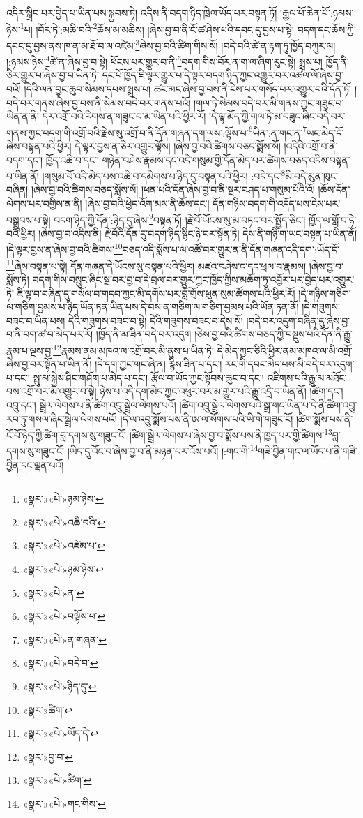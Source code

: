 འདིར་སྒྲིབ་པར་བྱེད་པ་ཡིན་པས་སྐྱབས་ཏེ། འདིས་ནི་བདག་ཉིད་ཁྲེལ་ཡོད་པར་བསྟན་ཏོ། །རྒྱལ་པོ་ཆེན་པོ་:ཉམས་ཉེས་\footnote{«སྣར་»«པེ་»ཉམ་ཉེས་}པ། །བོར་ཏེ་:མཆི་བའི་\footnote{«སྣར་»«པེ་»འཆི་བའི་}ཆོས་མ་མཆིས། །ཞེས་བྱ་བ་ནི་ངོ་ཚ་ཤེས་པའི་དབང་དུ་བྱས་པ་སྟེ། བདག་དང་ཆོས་ཀྱི་དབང་དུ་བྱས་ནས་ཁ་ན་མ་ཐོ་བ་ལ་འཛེམ་\footnote{«སྣར་»«པེ་»འཛེམ་པ་}ཞེས་བྱ་བའི་ཚིག་གིས་སོ། །བདེ་བའི་ཚེ་ན་རྟག་ཏུ་ཁྱོད་བཀུར་ལ། །:ཉམས་ཉེས་\footnote{«སྣར་»«པེ་»ཉམ་ཉེས་}ཚེ་ན་ཞེས་བྱ་བ་སྟེ། ཕོངས་པར་གྱུར་བ་ནི་\footnote{«སྣར་»«པེ་»ན་}བདག་གིས་བོར་ན་ག་ལ་ཞིག་རུང་སྟེ། སྨྲས་པ། ཁྱོད་ནི་ཅིར་གྱུར་པ་ཞེས་བྱ་བ་ཡིན་ཏེ། དང་པོ་ཁྱོད་ཇི་ལྟར་གྱུར་པ་དེ་ལྟར་བདག་ཉིད་ཀྱང་འགྱུར་བར་འཚལ་ལོ་ཞེས་བྱ་བའོ། །དེའི་ལན་བྱང་ཆུབ་སེམས་དཔས་སྨྲས་པ། ཚང་མང་ཞེས་བྱ་བས་ནི་ངེས་པར་གསོད་པར་འགྱུར་བའི་དོན་ཏོ། །བདེ་བར་གནས་ཞེས་བྱ་བས་ནི་སེམས་བདེ་བར་གནས་པའོ། །གལ་ཏེ་སེམས་བདེ་བར་མི་གནས་ཀྱང་གཟུང་བ་ཡིན་ན་ནི། དེར་འགྲོ་བའི་རིགས་ན་གཟུང་བ་མ་ཡིན་པའི་ཕྱིར་རོ། །དེ་ལྟ་མོད་ཀྱི་གལ་ཏེ་མ་བཟུང་ཞིང་བདེ་བར་གནས་ཀྱང་བདག་གི་འགྲོ་བའི་རྗེས་སུ་འགྲོ་བ་ནི་དོན་གཞན་དག་ལས་:ལྟོས་པ་\footnote{«སྣར་»«པེ་»བལྟོས་པ་}ཡིན་:ན་གང་ན་\footnote{«སྣར་»«པེ་»ན་གཞན་}ཡང་མེད་དོ་ཞེས་བསྟན་པའི་ཕྱིར། དེ་ལྟར་བྱས་ན་ཅིར་འགྱུར་ལྟོས། །ཞེས་བྱ་བའི་ཚིགས་བཅད་སྨོས་སོ། །འདིའི་འགྲོ་བ་ནི་བདག་དང་། ཁྱོད་འཆི་བ་དང་། གཉེན་བཤེས་རྣམས་དང་འདི་གསུམ་གྱི་དོན་མེད་པར་ཚིགས་བཅད་འདིས་བསྟན་པ་ཡིན་ནོ། །གསུམ་པོ་འདི་མེད་པས་འཆི་བ་དམིགས་པ་ཉིད་དུ་བསྟན་པའི་ཕྱིར། :བདེ་དང་\footnote{«སྣར་»«པེ་»བདེ་བ་}མི་བདེ་མུན་ཁུང་བཞིན། །ཞེས་བྱ་བའི་ཚིགས་བཅད་སྨོས་སོ། །ཕན་པའི་དོན་ཞེས་བྱ་བ་ནི་སྔར་བཤད་པ་གསུམ་པོའི་འོ། །ཆོས་དོན་ལེགས་པར་བགྱིས་ན་ནི། །ཞེས་བྱ་བའི་ཕྱེད་འོག་མས་ནི་ཆོས་དང་། དོན་གཉིས་བདག་གི་འདོད་པས་ངེས་པར་བསྒྲུབས་པ་སྟེ། བདག་ཉིད་ཀྱི་དོན་:ཉིད་དུ་ཞེས་\footnote{«སྣར་»«པེ་»ཉིད་དུ་}བསྟན་ཏོ། །རྗེ་བོ་ཡོངས་སུ་མ་བཏང་བར་སྤྱོད་ཅིང་། ཁྱོད་ལ་གློ་བ་ཉེ་བའི་ཕྱིར། །ཞེས་བྱ་བ་འདིས་ནི། རྗེ་བོའི་དོན་དུ་བདག་ཉིད་སྙིང་ཉེ་བར་སྟོན་ཏེ། དེས་ནི་གཉི་ག་ཡང་བསྟན་པ་ཡིན་ནོ། །དེ་ལྟར་བྱས་ན་ཞེས་བྱ་བའི་ཚིགས་\footnote{«སྣར་»ཚིག་}བཅད་འདི་སྨོས་པ་ལ་འཚོ་བར་གྱུར་ན་ནི་དོན་གཞན་འདི་དག་:ཡོད་དོ་\footnote{«སྣར་»«པེ་»ཡོད་དེ་}ཞེས་བསྟན་པ་སྟེ། དོན་གཞན་དེ་ཡོངས་སུ་བསྟན་པའི་ཕྱིར། མཛའ་བཤེས་ང་དང་ཕྲལ་བ་རྣམས། །ཞེས་བྱ་བ་སྨོས་ཏེ། བདག་གིས་བསྲུང་ཞིང་སྦ་བར་བྱ་བ་དེ་བྲལ་བར་གྱུར་ཀྱང་ཁྱོད་ཀྱིས་མཆོག་ཏུ་འབྱོར་པར་བྱེད་པར་འགྱུར་ཏེ། ཇི་ལྟ་བ་བཞིན་དུ་གསོལ་བ་གདབ་ཀྱང་མི་དགོས་པར་བློ་གྲོས་ཕུན་སུམ་ཚོགས་པའི་ཕྱིར་རོ། །དེ་གཉིས་གཅིག་ལ་གཅིག་བྱམས་པ་ཉིད་ཡོན་ཏན་ཡིན་པས་དེ་བས་ན་གཅིག་ལ་གཅིག་བྱམས་པའི་ཡོན་ཏན་ནོ། །དེ་གཟུགས་བཟང་བ་ཡིན་པས། དེའི་གཟུགས་བཟང་བ་སྟེ། དེའི་གཟུགས་བཟང་བ་དེས་སོ། །བདེ་བར་འདུག་བཞིན་དུ་ཞེས་བྱ་བ་ནི་བག་ཚ་བ་མེད་པར་རོ། །ཁྱོད་ནི་མ་ཟིན་བདེ་བར་འདུག །ཅེས་བྱ་བའི་ཚིགས་བཅད་ཀྱི་བསྡུས་པའི་དོན་ནི་རྒྱུ་རྣམ་པ་ལྔས་བྱ་\footnote{«སྣར་»བྱ་བ་}རྣམས་ནམ་མཁའ་ལ་འགྲོ་བར་མི་ནུས་པ་ཡིན་ཏེ། དེ་མེད་ཀྱང་ཅིའི་ཕྱིར་ནམ་མཁའ་ལ་མི་འགྲོ་ཞེས་བྱ་བར་སྟོན་པ་ཡིན་ནོ། །དེ་དག་ཀྱང་གང་ཞེ་ན། རྙིས་ཟིན་པ་དང་། རང་གི་དབང་མེད་པས་མི་བདེ་བར་འདུག་པ་དང་། སྤུ་མ་སྐྱེས་ཤིང་གཤོག་པ་མེད་པ་དང་། རྩོལ་བ་ཡོད་ཀྱང་སྟོབས་ཆུང་བ་དང་། འཇིགས་པའི་རྒྱུ་མ་མཐོང་བས་འགྲོ་བར་མི་འགྱུར་བ་སྟེ། ཉེས་པ་འདི་དག་མེད་ཀྱང་འཕུར་བར་མ་གྱུར་པའི་རྒྱུ་འདྲི་བ་ཡིན་ནོ། །ཚིག་དང་། འབྲུ་དང་། སྦྲེལ་ལེགས་པ་ནི་ཚིག་འབྲུ་སྦྲེལ་ལེགས་པའོ། །ཚིག་འབྲུ་སྦྲེལ་ལེགས་པའི་སྒྲ་གང་ཡིན་པ་དེ་ནི་ཚིག་འབྲུ་རབ་ཏུ་གསལ་ཞིང་སྦྲེལ་ལེགས་པའོ། །དེ་ལ་འབྲུ་སྨོས་པས་ནི་ཨ་ལ་སོགས་པའི་ཡི་གེ་གཟུང་ངོ། །ཚིག་སྨོས་པས་ནི་ངོ་བོ་ཉིད་ཀྱི་ཚིག་བླ་དགས་སུ་གཟུང་ངོ། །ཚིག་སྦྲེལ་ལེགས་པ་ཞེས་བྱ་བ་སྨོས་པས་ནི་ཁྱད་པར་གྱི་ཚིགས་\footnote{«སྣར་»«པེ་»ཚིག་}བླ་དགས་སུ་གཟུང་ངོ། །ཡིད་དུ་འོང་བ་ཞེས་བྱ་བ་ནི་མཉན་པར་འོས་པའོ། །:གང་གི་\footnote{«སྣར་»«པེ་»གང་གིས་}གཟི་བྱིན་གང་ལ་ཡོད་པ་ནི་གཟི་བྱིན་དང་ལྡན་པའོ། 